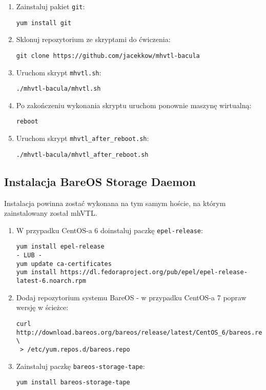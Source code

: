 \documentclass[polish]{article}
\begin{document}
\begin{enumerate}
\item Zainstaluj pakiet \texttt{git}:
\begin{verbatim}
yum install git
\end{verbatim}
\item Sklonuj repozytorium ze skryptami do ćwiczenia:
\begin{verbatim}
git clone https://github.com/jacekkow/mhvtl-bacula
\end{verbatim}
\item Uruchom skrypt \texttt{mhvtl.sh}:
\begin{verbatim}
./mhvtl-bacula/mhvtl.sh
\end{verbatim}
\item Po zakończeniu wykonania skryptu uruchom ponownie maszynę wirtualną:
\begin{verbatim}
reboot
\end{verbatim}
\item Uruchom skrypt \texttt{mhvtl\_after\_reboot.sh}:
\begin{verbatim}
./mhvtl-bacula/mhvtl_after_reboot.sh
\end{verbatim}

\end{enumerate}


\subsection*{Instalacja BareOS Storage Daemon}

Instalacja powinna zostać wykonana na tym samym hoście,
na którym zainstalowany został mhVTL.

\begin{enumerate}

\item W przypadku CentOS-a 6 doinstaluj paczkę \texttt{epel-release}:
\begin{verbatim}
yum install epel-release
- LUB -
yum update ca-certificates
yum install https://dl.fedoraproject.org/pub/epel/epel-release-latest-6.noarch.rpm
\end{verbatim}

\item Dodaj repozytorium systemu BareOS - w przypadku CentOS-a 7 popraw wersję w ścieżce:
\begin{verbatim}
curl http://download.bareos.org/bareos/release/latest/CentOS_6/bareos.repo \
 > /etc/yum.repos.d/bareos.repo
\end{verbatim}

\item Zainstaluj paczkę \texttt{bareos-storage-tape}:
\begin{verbatim}
yum install bareos-storage-tape
\end{verbatim}

\end{enumerate}
\end{document}
